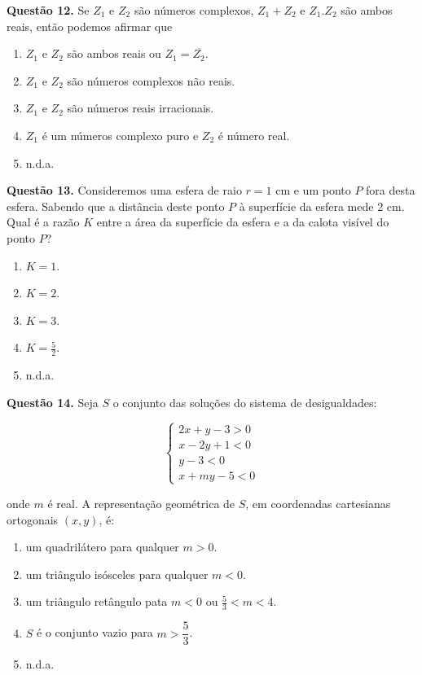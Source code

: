 \documentclass[11pt]{article}
\begin{document}
\textbf{Questão 12.} Se $Z_1$ e $Z_2$ são números complexos, $Z_1 + Z_2$ e $Z_1.Z_2$ são ambos reais, então podemos afirmar que 

\begin{enumerate}[\bf A (\quad)]
    \item $Z_1$ e $Z_2$ são ambos reais ou $Z_1 = \overline{Z_2}$.
    \item $Z_1$ e $Z_2$ são números complexos não reais.
    \item $Z_1$ e $Z_2$ são números reais irracionais.
    \item $Z_1$ é um números complexo puro e $Z_2$ é número real.
    \item n.d.a.
\end{enumerate}


\textbf{Questão 13.} Consideremos uma esfera de raio $r = 1$ cm e um ponto $P$ fora desta esfera. Sabendo que a distância deste ponto $P$ à superfície da esfera mede 2 cm. Qual é a razão $K$ entre a área da superfície da esfera e a da calota visível do ponto $P$?

\begin{multicols}{5}
    \begin{enumerate}[\bf A (\quad)]
        \item $K = 1$.
        \item $K = 2$.
        \item $K = 3$.
        \item $\displaystyle K = \frac{5}{2}$.
        \item n.d.a.
    \end{enumerate}
\end{multicols}


\textbf{Questão 14.} Seja $S$ o conjunto das soluções do sistema de desigualdades:

$$
\begin{cases}
2x + y - 3 > 0 \\
x - 2y + 1 < 0 \\
y- 3 < 0 \\
x + my - 5 < 0 
\end{cases}
$$

onde $m$ é real. A representação geométrica de $S$, em coordenadas cartesianas ortogonais $(x,y)$, é:

\begin{enumerate}[\bf A (\quad)]
    \item um quadrilátero para qualquer $m > 0$.
    \item um triângulo isósceles para qualquer $m < 0$.
    \item um triângulo retângulo pata $m < 0$ ou $\displaystyle \frac{5}{3} < m < 4$.
    \item $S$ é o conjunto vazio para $m > \dfrac{5}{3}$.
    \item n.d.a.
\end{enumerate}
\end{document}
